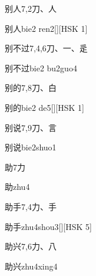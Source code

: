 \begin{Entry}{别人}{7,2}{⼑、⼈}
  \begin{Phonetics}{别人}{bie2 ren2}[][HSK 1]
  \end{Phonetics}
\end{Entry}

\begin{Entry}{别不过}{7,4,6}{⼑、⼀、⾡}
  \begin{Phonetics}{别不过}{bie2 bu2guo4}
  \end{Phonetics}
\end{Entry}

\begin{Entry}{别的}{7,8}{⼑、⽩}
  \begin{Phonetics}{别的}{bie2 de5}[][HSK 1]
  \end{Phonetics}
\end{Entry}

\begin{Entry}{别说}{7,9}{⼑、⾔}
  \begin{Phonetics}{别说}{bie2shuo1}
  \end{Phonetics}
\end{Entry}

\begin{Entry}{助}{7}{⼒}
  \begin{Phonetics}{助}{zhu4}
  \end{Phonetics}
\end{Entry}

\begin{Entry}{助手}{7,4}{⼒、⼿}
  \begin{Phonetics}{助手}{zhu4shou3}[][HSK 5]
  \end{Phonetics}
\end{Entry}

\begin{Entry}{助兴}{7,6}{⼒、⼋}
  \begin{Phonetics}{助兴}{zhu4xing4}
  \end{Phonetics}
\end{Entry}

